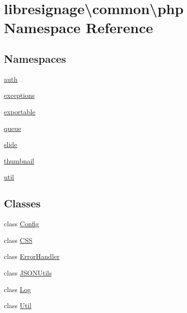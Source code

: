 \hypertarget{namespacelibresignage_1_1common_1_1php}{}\section{libresignage\textbackslash{}common\textbackslash{}php Namespace Reference}
\label{namespacelibresignage_1_1common_1_1php}
\subsection*{Namespaces}
\begin{DoxyCompactItemize}
\item 
 \hyperlink{namespacelibresignage_1_1common_1_1php_1_1auth}{auth}
\item 
 \hyperlink{namespacelibresignage_1_1common_1_1php_1_1exceptions}{exceptions}
\item 
 \hyperlink{namespacelibresignage_1_1common_1_1php_1_1exportable}{exportable}
\item 
 \hyperlink{namespacelibresignage_1_1common_1_1php_1_1queue}{queue}
\item 
 \hyperlink{namespacelibresignage_1_1common_1_1php_1_1slide}{slide}
\item 
 \hyperlink{namespacelibresignage_1_1common_1_1php_1_1thumbnail}{thumbnail}
\item 
 \hyperlink{namespacelibresignage_1_1common_1_1php_1_1util}{util}
\end{DoxyCompactItemize}
\subsection*{Classes}
\begin{DoxyCompactItemize}
\item 
class \hyperlink{classlibresignage_1_1common_1_1php_1_1Config}{Config}
\item 
class \hyperlink{classlibresignage_1_1common_1_1php_1_1CSS}{C\+SS}
\item 
class \hyperlink{classlibresignage_1_1common_1_1php_1_1ErrorHandler}{Error\+Handler}
\item 
class \hyperlink{classlibresignage_1_1common_1_1php_1_1JSONUtils}{J\+S\+O\+N\+Utils}
\item 
class \hyperlink{classlibresignage_1_1common_1_1php_1_1Log}{Log}
\item 
class \hyperlink{classlibresignage_1_1common_1_1php_1_1Util}{Util}
\end{DoxyCompactItemize}
